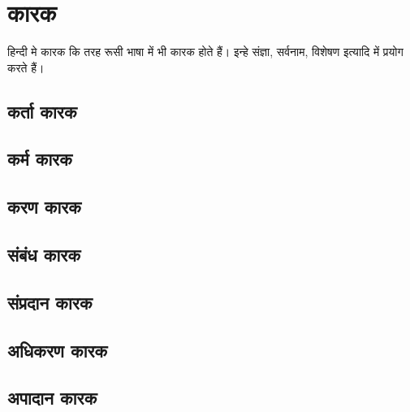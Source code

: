 \chapter{कारक}\label{ch:cases}

हिन्दी मे कारक कि तरह रूसी भाषा में भी कारक होते हैं। इन्हे संज्ञा, सर्वनाम, विशेषण इत्यादि में प्रयोग करते हैं।


\section{कर्ता कारक} \label{sec:nominative-case}


\section{कर्म कारक} \label{sec:accusative-case}


\section{करण कारक} \label{sec:instrumental-case}


\section{संबंध कारक}  \label{sec:prepositional-case}


\section{संप्रदान कारक}  \label{sec:dative-case}


\section{अधिकरण कारक} \label{sec:genitive-case}


\section{अपादान कारक} \label{sec:ablative-case}